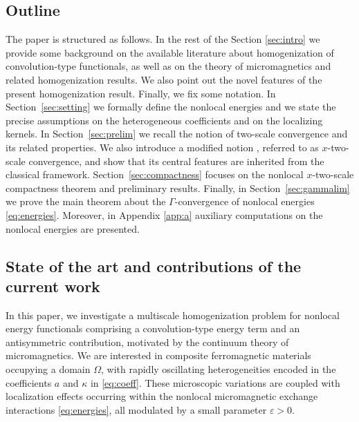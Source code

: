 \documentclass[reqno,11pt]{amsart}
\numberwithin{equation}{section}
\theoremstyle{thmlemcorr}
\numberwithin{theorem}{section}
\theoremstyle{thmlemcorr*}
\theoremstyle{defi}
\theoremstyle{remexample}
\theoremstyle{ass}
\newcommand{\1}{\mathds{1}}
\newcommand{\Om}{\Omega}
\newcommand{\veps}{\varepsilon}
\begin{document}
 \subsection*{Outline }\label{sec:outline}
    The paper is structured as follows.  
    In the rest of the Section \ref{sec:intro} we provide some background on the available literature about homogenization of convolution-type functionals, as well as on the theory of micromagnetics and related homogenization results. We also point out the novel features of the present homogenization result. Finally, we fix some notation.
    In Section~\ref{sec:setting} we formally define the nonlocal energies and we state the precise assumptions on the heterogeneous coefficients %
    and on the localizing kernels. %
    In Section~\ref{sec:prelim} we recall the notion of two-scale convergence and its related properties. We also introduce a modified notion%
    , referred to as \(x\)-two-scale convergence, and show that its central features are inherited from the classical framework. Section~\ref{sec:compactness} focuses on the nonlocal $x$-two-scale compactness theorem and preliminary results.
    Finally, in Section~\ref{sec:gammalim} we prove the main theorem about the $\Gamma$-convergence of nonlocal energies \eqref{eq:energies}. Moreover, in Appendix \ref{app:a} auxiliary computations on the nonlocal energies are presented.


        

\subsection{State of the art and contributions of the current work}\label{sec:background}
In this paper, we investigate a multiscale homogenization problem for nonlocal energy functionals comprising a convolution-type energy term and an antisymmetric contribution, motivated by the continuum theory of micromagnetics. We are interested in composite ferromagnetic materials occupying a domain $\Om$, with rapidly oscillating heterogeneities encoded in the coefficients $a$ and $\kappa$ in \eqref{eq:coeff}. These microscopic variations are coupled with localization effects occurring within the nonlocal micromagnetic exchange interactions \eqref{eq:energies}, all modulated by a small parameter $\veps > 0.$
\end{document}
